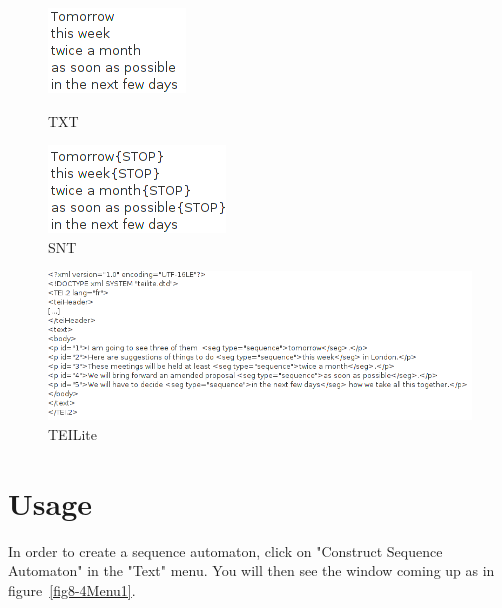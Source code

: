 \begin{figure}[!ht]
	\begin{minipage}[h!]{0.5\linewidth}
		\centering
		\includegraphics[scale=0.6]{resources/img/fig8-1tomorrow.png}	
		\caption{TXT\label{fig8-1CorpusTxt}}
		\label{fig7-TXT}
	\end{minipage}
	\hspace{0.1cm}
	\begin{minipage}[h!]{0.5\linewidth}
		\centering
		\includegraphics[scale=0.6]{resources/img/fig8-2tomorrowSNT.png}
		\caption{SNT\label{fig8-2CorpusSNT}}
	\end{minipage}
	\hspace{0.1cm}
\end{figure}
\begin{figure}[!ht]
	\begin{minipage}[h!]{\linewidth}
		\centering
			\includegraphics[width=14cm]{resources/img/fig8-3tomorrowTEI.png}
			\caption{TEILite\label{fig8-3CorpusTEI}}
	\end{minipage}
\end{figure}
\section{Usage}
In order to create a sequence automaton, click on "Construct Sequence Automaton" in the "Text" menu. You will then see the window coming up as in figure~\ref{fig8-4Menu1}.

